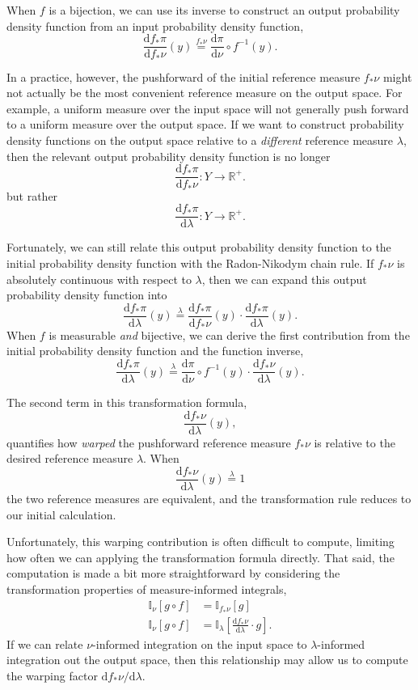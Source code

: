 \documentclass[
  letterpaper,
  DIV=11,
  numbers=noendperiod]{scrartcl}
\begin{document}
When \(f\) is a bijection, we can use its inverse to construct an output
probability density function from an input probability density function,
\[
\frac{ \mathrm{d} f_{*} \pi }{ \mathrm{d} f_{*} \nu}(y)
\overset{f_{*} \nu}{=}
\frac{ \mathrm{d} \pi }{ \mathrm{d} \nu} \circ f^{-1}(y).
\]

In a practice, however, the pushforward of the initial reference measure
\(f_{*} \nu\) might not actually be the most convenient reference
measure on the output space. For example, a uniform measure over the
input space will not generally push forward to a uniform measure over
the output space. If we want to construct probability density functions
on the output space relative to a \emph{different} reference measure
\(\lambda\), then the relevant output probability density function is no
longer \[
\frac{ \mathrm{d} f_{*} \pi }{ \mathrm{d} f_{*} \nu} :
Y \rightarrow \mathbb{R}^{+}.
\] but rather \[
\frac{ \mathrm{d} f_{*} \pi }{ \mathrm{d} \lambda} :
Y \rightarrow \mathbb{R}^{+}.
\]

Fortunately, we can still relate this output probability density
function to the initial probability density function with the
Radon-Nikodym chain rule. If \(f_{*} \nu\) is absolutely continuous with
respect to \(\lambda\), then we can expand this output probability
density function into \[
\frac{ \mathrm{d} f_{*} \pi }{ \mathrm{d} \lambda}(y)
\overset{\lambda}{=}
\frac{ \mathrm{d} f_{*} \pi }{ \mathrm{d} f_{*} \nu}(y)
\cdot
\frac{ \mathrm{d} f_{*} \pi }{ \mathrm{d} \lambda}(y).
\] When \(f\) is measurable \emph{and} bijective, we can derive the
first contribution from the initial probability density function and the
function inverse, \[
\frac{ \mathrm{d} f_{*} \pi }{ \mathrm{d} \lambda}(y)
\overset{\lambda}{=}
\frac{ \mathrm{d} \pi }{ \mathrm{d} \nu} \circ f^{-1}(y)
\cdot
\frac{ \mathrm{d} f_{*} \nu }{ \mathrm{d} \lambda}(y).
\]

The second term in this transformation formula, \[
\frac{ \mathrm{d} f_{*} \nu }{ \mathrm{d} \lambda}(y),
\] quantifies how \emph{warped} the pushforward reference measure
\(f_{*} \nu\) is relative to the desired reference measure \(\lambda\).
When \[
\frac{ \mathrm{d} f_{*} \nu }{ \mathrm{d} \lambda}(y)
\overset{\lambda}{=} 1
\] the two reference measures are equivalent, and the transformation
rule reduces to our initial calculation.

Unfortunately, this warping contribution is often difficult to compute,
limiting how often we can applying the transformation formula directly.
That said, the computation is made a bit more straightforward by
considering the transformation properties of measure-informed integrals,
\begin{align*}
\mathbb{I}_{\nu}[g \circ f]
&=
\mathbb{I}_{f_{*} \nu}[g]
\\
\mathbb{I}_{\nu} [ g \circ f ]
&=
\mathbb{I}_{\lambda} \left[
\frac{ \mathrm{d} f_{*} \nu }{ \mathrm{d} \lambda} \cdot g
\right].
\end{align*} If we can relate \(\nu\)-informed integration on the input
space to \(\lambda\)-informed integration out the output space, then
this relationship may allow us to compute the warping factor
\(\mathrm{d} f_{*} \nu / \mathrm{d} \lambda\).
\end{document}
